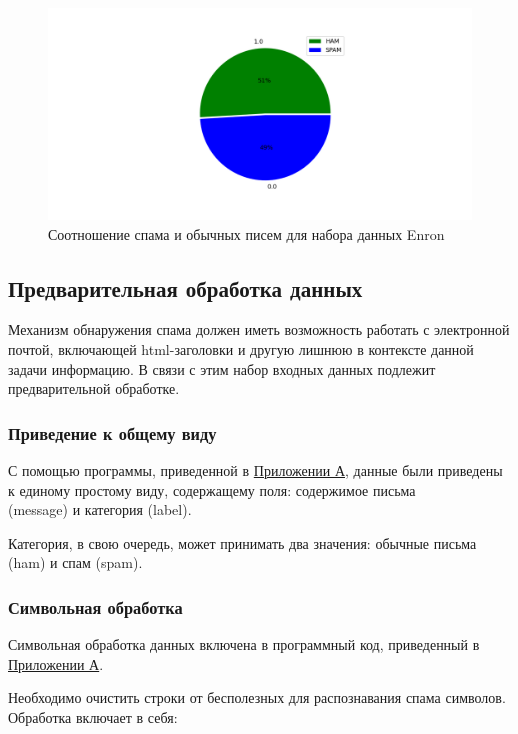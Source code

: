 \begin{figure}[H]
    \centering
    \includegraphics[width=150mm]{static/enron.png}
    \caption{Соотношение спама и обычных писем для набора данных Enron}
    \label{EnronScheme}
\end{figure}


\subsection{Предварительная обработка данных}

Механизм обнаружения спама должен иметь возможность работать с электронной почтой,
включающей html-заголовки и другую лишнюю в контексте данной задачи информацию.
В связи с этим набор входных данных подлежит предварительной обработке.

\subsubsection{Приведение к общему виду}

С помощью программы, приведенной в \hyperref[App1]{Приложении А}, данные были приведены к единому простому виду, содержащему поля:
содержимое письма \\(message) и категория (label).

Категория, в свою очередь, может принимать два значения: обычные письма (ham) и спам (spam).

\subsubsection{Символьная обработка}

Символьная обработка данных включена в программный код, приведенный в \hyperref[App1]{Приложении А}.

Необходимо очистить строки от бесполезных для распознавания спама символов. Обработка включает в себя:

